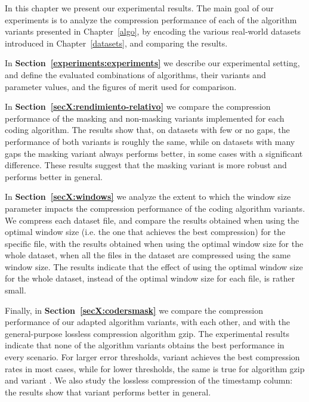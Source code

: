 






In this chapter we present our experimental results. The main goal of our experiments is to analyze the compression performance of each of the algorithm variants presented in Chapter~\ref{algo}, by encoding the various real-world datasets introduced in Chapter~\ref{datasets}, and comparing the results.

In \textbf{Section~\ref{experiments:experiments}} we describe our experimental setting, and define the evaluated combinations of algorithms, their variants and parameter values, and the figures of merit used for comparison. 

In \textbf{Section~\ref{secX:rendimiento-relativo}} we compare the compression performance of the masking and non-masking variants implemented for each coding algorithm. The results show that, on datasets with few or no gaps, the performance of both variants is roughly the same, while on datasets with many gaps the masking variant always performs better, in some cases with a significant difference. These results suggest that the masking variant is more robust and performs better in general. 

In \textbf{Section~\ref{secX:windows}} we analyze the extent to which the window size parameter impacts the compression performance of the coding algorithm variants. We compress each dataset file, and compare the results obtained when using the optimal window size (i.e. the one that achieves the best compression) for the specific file, with the results obtained when using the optimal window size for the whole dataset, when all the files in the dataset are compressed using the same window size. The results indicate that the effect of using the optimal window size for the whole dataset, instead of the optimal window size for each file, is rather small. 

Finally, in \textbf{Section~\ref{secX:codersmask}} we compare the compression performance of our adapted algorithm variants, with each other, and with the general-purpose lossless compression algorithm gzip. The experimental results indicate that none of the algorithm variants obtains the best performance in every scenario. For larger error thresholds, variant  achieves the best compression rates in most cases, while for lower thresholds, the same is true for algorithm gzip and variant . We also study the lossless compression of the timestamp column: the results show that variant  performs better in general.
